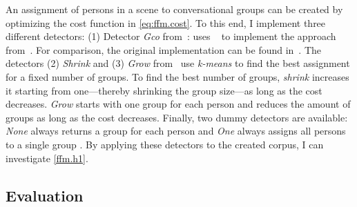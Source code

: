 An assignment of persons in a scene to \glspl{conversational group} can be created by optimizing the cost function in \cref{eq:ffm.cost}.
To this end, I implement three different detectors:
(1) Detector \emph{Gco} from~: uses ~ to implement the approach from~.
For comparison, the original implementation can be found in~.
The detectors (2) \emph{Shrink} and (3) \emph{Grow} from~ use \emph{k-means} to find the best assignment for a fixed number of groups.
To find the best number of groups, \emph{shrink} increases it starting from one---thereby shrinking the group size---as long as the cost decreases.
\emph{Grow} starts with one group for each person and reduces the amount of groups as long as the cost decreases.
Finally, two dummy detectors are available: \emph{None} always returns a group for each person and \emph{One} always assigns all persons to a single group \cite{ffm}.
By applying these detectors to the created corpus, I can investigate \cref{ffm.h1}.

\subsection{Evaluation}

